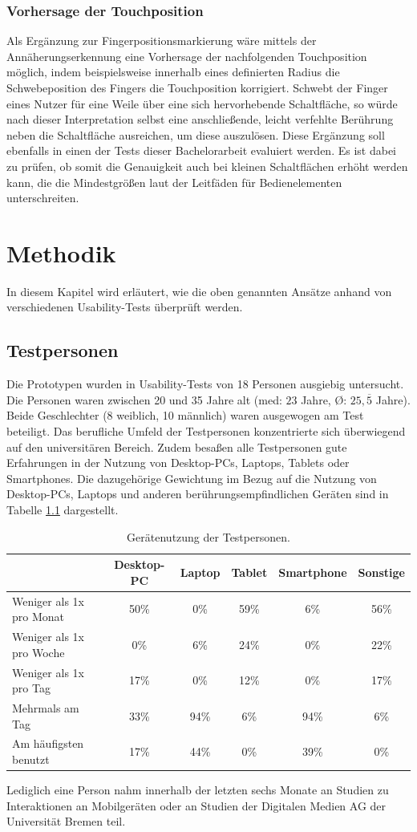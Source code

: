 \documentclass[a4paper,12pt,bibliography=totoc]{scrreprt}%
\begin{document}
\subsection{Vorhersage der Touchposition}
Als Ergänzung zur Fingerpositionsmarkierung wäre mittels der Annäherungserkennung eine Vorhersage der nachfolgenden Touchposition möglich, indem beispielsweise innerhalb eines definierten Radius die Schwebeposition des Fingers die Touchposition korrigiert. Schwebt der Finger eines Nutzer für eine Weile über eine sich hervorhebende Schaltfläche, so würde nach dieser Interpretation selbst eine anschließende, leicht verfehlte Berührung neben die Schaltfläche ausreichen, um diese auszulösen. Diese Ergänzung soll ebenfalls in einen der Tests dieser Bachelorarbeit evaluiert werden. Es ist dabei zu prüfen, ob somit die Genauigkeit auch bei kleinen Schaltflächen erhöht werden kann, die die Mindestgrößen laut der Leitfäden für Bedienelementen unterschreiten.

\chapter{Methodik}
In diesem Kapitel wird erläutert, wie die oben genannten Ansätze anhand von verschiedenen Usability-Tests überprüft werden.

\section{Testpersonen}
Die Prototypen wurden in Usability-Tests von 18 Personen ausgiebig untersucht. Die Personen waren zwischen 20 und 35 Jahre alt (med: $23$ Jahre, \O: $25{,}\overline 5$ Jahre). Beide Geschlechter (8 weiblich, 10 männlich) waren ausgewogen am Test beteiligt. Das berufliche Umfeld der Testpersonen konzentrierte sich überwiegend auf den universitären Bereich. Zudem besaßen alle Testpersonen gute Erfahrungen in der Nutzung von Desktop-PCs, Laptops, Tablets oder Smartphones. Die dazugehörige Gewichtung im Bezug auf die Nutzung von Desktop-PCs, Laptops und anderen berührungsempfindlichen Geräten sind in Tabelle \ref{nutzungtestpersonen} dargestellt.
\begin{table}
\centering
\renewcommand{\arraystretch}{2}
\setlength{\tabcolsep}{4pt}
\begin{tabular}{ p{4.8cm} | c c c c c}
& Desktop-PC & Laptop & Tablet & Smartphone & Sonstige\\\hline
Weniger als 1x pro Monat & 50\% & 0\% & 59\% & 6\% & 56\%\\
Weniger als 1x pro Woche & 0\% & 6\% & 24\% & 0\% & 22\% \\
Weniger als 1x pro Tag & 17\% & 0\% & 12\% & 0\% & 17\% \\
Mehrmals am Tag & 33\% & 94\% & 6\% & 94\% & 6\% \\
\hline
Am häufigsten benutzt & 17\% & 44\% & 0\% & 39\% & 0\% \\
\end{tabular}
\caption{Gerätenutzung der Testpersonen.}
\label{nutzungtestpersonen}
\end{table}
Lediglich eine Person nahm innerhalb der letzten sechs Monate an Studien zu Interaktionen an Mobilgeräten oder an Studien der Digitalen Medien AG der Universität Bremen teil.
\end{document}
